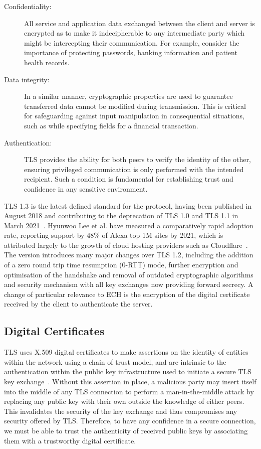 \begin{description}
\item[Confidentiality:] All service and application data exchanged between the client and server is encrypted as to make it indecipherable to any intermediate party which might be intercepting their communication. For example, consider the importance of protecting passwords, banking information and patient health records.
\item[Data integrity:] In a similar manner, cryptographic properties are used to guarantee transferred data cannot be modified during transmission. This is critical for safeguarding against input manipulation in consequential situations, such as while specifying fields for a financial transaction.
\item[Authentication:] TLS provides the ability for both peers to verify the identity of the other, ensuring privileged communication is only performed with the intended recipient. Such a condition is fundamental for establishing trust and confidence in any sensitive environment.
\end{description}

TLS 1.3 is the latest defined standard for the protocol, having been published in August 2018 and contributing to the deprecation of TLS 1.0 and TLS 1.1 in March 2021~\cite{rfc8446, rfc8996}. Hyunwoo Lee et al. have measured a comparatively rapid adoption rate, reporting support by 48\% of Alexa top 1M sites by 2021, which is attributed largely to the growth of cloud hosting providers such as Cloudflare~\cite{holz2019era, lee2021tls}. The version introduces many major changes over TLS 1.2, including the addition of a zero round trip time resumption (0-RTT) mode, further encryption and optimisation of the handshake and removal of outdated cryptographic algorithms and security mechanism with all key exchanges now providing forward secrecy. A change of particular relevance to ECH is the encryption of the digital certificate received by the client to authenticate the server.

\subsection{Digital Certificates}

TLS uses X.509 digital certificates to make assertions on the identity of entities within the network using a chain of trust model, and are intrinsic to the authentication within the public key infrastructure used to initiate a secure TLS key exchange~\cite{rfc4158}. Without this assertion in place, a malicious party may insert itself into the middle of any TLS connection to perform a man-in-the-middle attack by replacing any public key with their own outside the knowledge of either peers. This invalidates the security of the key exchange and thus compromises any security offered by TLS. Therefore, to have any confidence in a secure connection, we must be able to trust the authenticity of received public keys by associating them with a trustworthy digital certificate.

